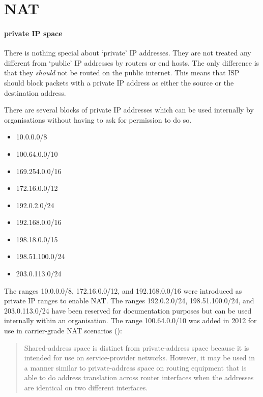 \section{\Acl{NAT}}
\label{sec:ip-nat}


\paragraph{private \acs{IP} space}
There is nothing special about `private' \acs{IP} addresses.
They are not treated any different from `public' \acs{IP} addresses by routers or end hosts.
The only difference is that they \emph{should} not be routed on the public internet.
This means that \acl{ISP} should block packets with a private \acs{IP} address as either the source or the destination address.

There are several blocks of private \acs{IP} addresses which can be used internally by organisations without having to ask for permission to do so.
\begin{multicols}{2}
\raggedcolumns
\begin{itemize}
\item 10.0.0.0/8
\item 100.64.0.0/10
\item 169.254.0.0/16
\item 172.16.0.0/12
\item 192.0.2.0/24
\item 192.168.0.0/16
\item 198.18.0.0/15
\item 198.51.100.0/24
\item 203.0.113.0/24
\end{itemize}
\end{multicols}

The ranges 10.0.0.0/8, 172.16.0.0/12, and 192.168.0.0/16 were introduced as private IP ranges to enable \acf{NAT}.
The ranges 192.0.2.0/24, 198.51.100.0/24, and 203.0.113.0/24 have been reserved for documentation purposes but can be used internally within an organisation.
The range 100.64.0.0/10 was added in 2012 for use in carrier-grade \ac{NAT} scenarios ():

\begin{quote}
Shared-address space is distinct from  private-address space because it is intended for use on service-provider networks.
However, it may be used in a manner similar to  private-address space on routing equipment that is able to do address translation across router interfaces when the addresses are identical on two different interfaces.
\end{quote}

